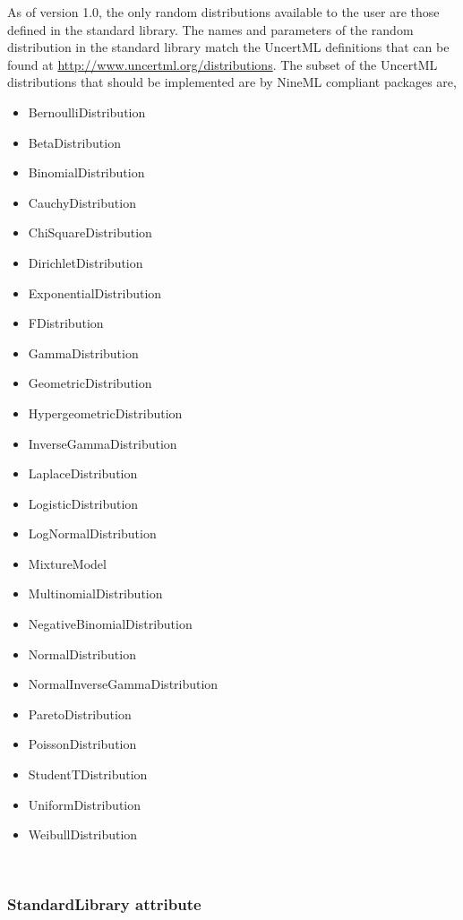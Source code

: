 \documentclass[draftspec]{ninemlspec}
\begin{document}
As of version 1.0, the only random distributions available to the user are those defined in the standard library. The names and parameters of the random distribution in the standard library match the UncertML definitions that can be found at \href{http://www.uncertml.org/distributions}{http://www.uncertml.org/distributions}. The subset of the UncertML distributions that should be implemented are by NineML compliant packages are,

\begin{itemize}
\item BernoulliDistribution
\item BetaDistribution
\item BinomialDistribution
\item CauchyDistribution
\item ChiSquareDistribution
\item DirichletDistribution
\item ExponentialDistribution
\item FDistribution
\item GammaDistribution
\item GeometricDistribution
\item HypergeometricDistribution
\item InverseGammaDistribution
\item LaplaceDistribution
\item LogisticDistribution
\item LogNormalDistribution
\item MixtureModel
\item MultinomialDistribution
\item NegativeBinomialDistribution
\item NormalDistribution
\item NormalInverseGammaDistribution
\item ParetoDistribution
\item PoissonDistribution
\item StudentTDistribution
\item UniformDistribution
\item WeibullDistribution
\end{itemize}

~


\subsubsection{StandardLibrary attribute}
\end{document}
